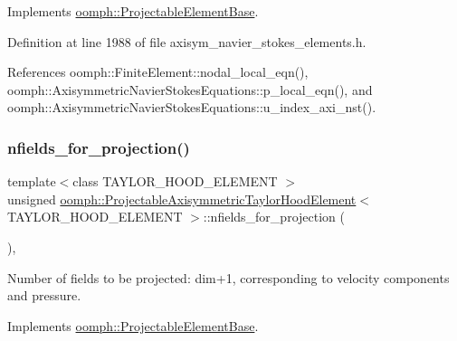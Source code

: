 Implements \hyperlink{classoomph_1_1ProjectableElementBase_ac5c27ae929ff636dc7747fe23fd4f738}{oomph\+::\+Projectable\+Element\+Base}.



Definition at line 1988 of file axisym\+\_\+navier\+\_\+stokes\+\_\+elements.\+h.



References oomph\+::\+Finite\+Element\+::nodal\+\_\+local\+\_\+eqn(), oomph\+::\+Axisymmetric\+Navier\+Stokes\+Equations\+::p\+\_\+local\+\_\+eqn(), and oomph\+::\+Axisymmetric\+Navier\+Stokes\+Equations\+::u\+\_\+index\+\_\+axi\+\_\+nst().

\mbox{\label{classoomph_1_1ProjectableAxisymmetricTaylorHoodElement_a60842beb2f919f071623db9c1dc8a69a}} 
\subsubsection{\texorpdfstring{nfields\+\_\+for\+\_\+projection()}{nfields\_for\_projection()}}
{\footnotesize\ttfamily template$<$class T\+A\+Y\+L\+O\+R\+\_\+\+H\+O\+O\+D\+\_\+\+E\+L\+E\+M\+E\+NT $>$ \\
unsigned \hyperlink{classoomph_1_1ProjectableAxisymmetricTaylorHoodElement}{oomph\+::\+Projectable\+Axisymmetric\+Taylor\+Hood\+Element}$<$ T\+A\+Y\+L\+O\+R\+\_\+\+H\+O\+O\+D\+\_\+\+E\+L\+E\+M\+E\+NT $>$\+::nfields\+\_\+for\+\_\+projection (\begin{DoxyParamCaption}{ }\end{DoxyParamCaption})\hspace{0.3cm}{\ttfamily [inline]}, {\ttfamily [virtual]}}



Number of fields to be projected\+: dim+1, corresponding to velocity components and pressure. 



Implements \hyperlink{classoomph_1_1ProjectableElementBase_a44634aa4049332a580d249c25564638c}{oomph\+::\+Projectable\+Element\+Base}.



